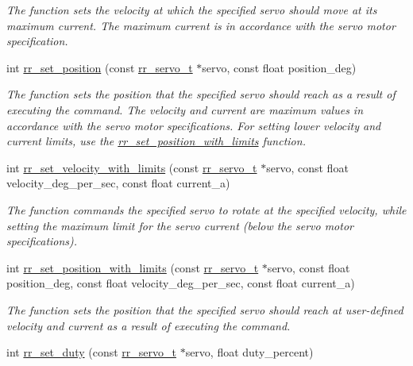 \begin{DoxyCompactItemize}
\begin{DoxyCompactList}\small\item\em The function sets the velocity at which the specified servo should move at its maximum current. The maximum current is in accordance with the servo motor specification. \end{DoxyCompactList}\item 
int \hyperlink{group___servo__control_gaddb31db79640ec345eb237ddc4d1078f}{rr\+\_\+set\+\_\+position} (const \hyperlink{structrr__servo__t}{rr\+\_\+servo\+\_\+t} $\ast$servo, const float position\+\_\+deg)
\begin{DoxyCompactList}\small\item\em The function sets the position that the specified servo should reach as a result of executing the command. The velocity and current are maximum values in accordance with the servo motor specifications. For setting lower velocity and current limits, use the \hyperlink{group___servo__control_ga6927d2a1d6ef5a0564b676817c88b82a}{rr\+\_\+set\+\_\+position\+\_\+with\+\_\+limits} function. \end{DoxyCompactList}\item 
int \hyperlink{group___servo__control_ga252ba86c50217d9ccf08deaf4c75f2e7}{rr\+\_\+set\+\_\+velocity\+\_\+with\+\_\+limits} (const \hyperlink{structrr__servo__t}{rr\+\_\+servo\+\_\+t} $\ast$servo, const float velocity\+\_\+deg\+\_\+per\+\_\+sec, const float current\+\_\+a)
\begin{DoxyCompactList}\small\item\em The function commands the specified servo to rotate at the specified velocity, while setting the maximum limit for the servo current (below the servo motor specifications). \end{DoxyCompactList}\item 
int \hyperlink{group___servo__control_ga6927d2a1d6ef5a0564b676817c88b82a}{rr\+\_\+set\+\_\+position\+\_\+with\+\_\+limits} (const \hyperlink{structrr__servo__t}{rr\+\_\+servo\+\_\+t} $\ast$servo, const float position\+\_\+deg, const float velocity\+\_\+deg\+\_\+per\+\_\+sec, const float current\+\_\+a)
\begin{DoxyCompactList}\small\item\em The function sets the position that the specified servo should reach at user-\/defined velocity and current as a result of executing the command. \end{DoxyCompactList}\item 
int \hyperlink{group___servo__control_ga67890b1af333ce15f291a24ddc5760d1}{rr\+\_\+set\+\_\+duty} (const \hyperlink{structrr__servo__t}{rr\+\_\+servo\+\_\+t} $\ast$servo, float duty\+\_\+percent)

\end{DoxyCompactItemize}
